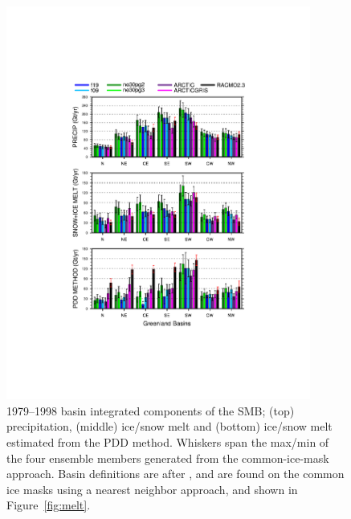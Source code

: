 \documentclass[draft]{agujournal2019}
\begin{document}
\begin{figure}[t]
\begin{center}
         \includegraphics[width=100mm]{figs/temp_tseries_BASIN.pdf}
\end{center}
\caption{1979--1998 basin integrated components of the SMB; (top) precipitation, (middle) ice/snow melt and (bottom) ice/snow melt estimated from the PDD method. Whiskers span the max/min of the four ensemble members generated from the common-ice-mask approach. Basin definitions are after , and are found on the common ice masks using a nearest neighbor approach, and shown in Figure~\ref{fig:melt}.}
\label{fig:basin}
\end{figure}
\end{document}
